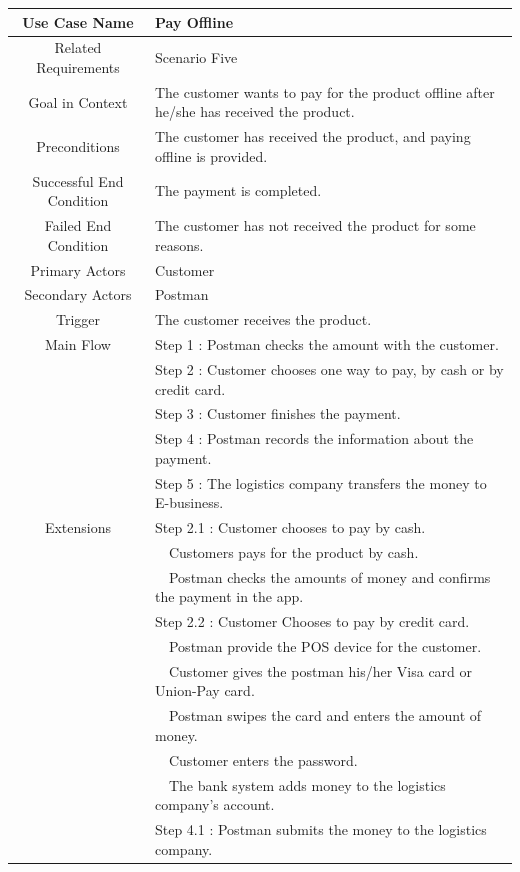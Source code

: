 \documentclass[12pt]{scrreprt}
\begin{document}
\begin{table}
  \centering
  \begin{tabular}{| c | p{11cm} |}
    \hline
    Use Case Name & Pay Offline\\
    \hline
    Related Requirements & Scenario Five\\
    \hline
    Goal in Context & The customer wants to pay for the product offline after
    he/she has received the product.\\
    \hline
    Preconditions & The customer has received the product, and paying offline
    is provided.\\
    \hline
    Successful End Condition & The payment is completed.\\
    \hline
    Failed End Condition & The customer has not received the product for some
    reasons.\\
    \hline
    Primary Actors & Customer\\
    \hline
    Secondary Actors & Postman\\
    \hline
    Trigger & The customer receives the product.\\
    \hline
    Main Flow & Step 1 : Postman checks the amount with the customer.\\
    & Step 2 : Customer chooses one way to pay, by cash or by credit card.\\
    & Step 3 : Customer finishes the payment.\\
    & Step 4 : Postman records the information about the payment.\\
    & Step 5 : The logistics company transfers the money to E-business.\\
    \hline
    Extensions & Step 2.1 : Customer chooses to pay by cash.\\
    & \ \ Customers pays for the product by cash.\\
    & \ \ Postman checks the amounts of money and confirms the payment in the app.\\
    & Step 2.2 : Customer Chooses to pay by credit card.\\
    & \ \ Postman provide the POS device for the customer.\\
    & \ \ Customer gives the postman his/her Visa card or Union-Pay card.\\
    & \ \ Postman swipes the card and enters the amount of money.\\
    & \ \ Customer enters the password.\\
    & \ \ The bank system adds money to the logistics company’s account.\\
    & Step 4.1 : Postman submits the money to the logistics company.\\
    \hline
  \end{tabular}
\end{table}
\end{document}
